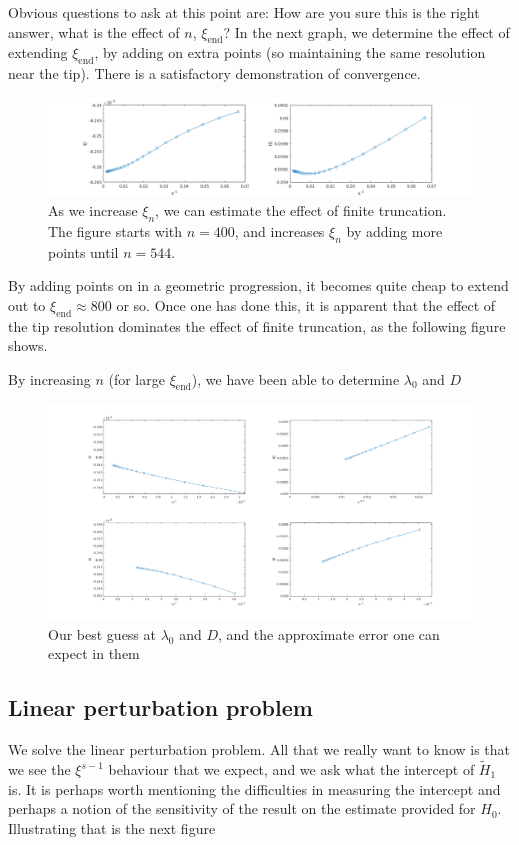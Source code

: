 \documentclass{jfm}
\begin{document}
Obvious questions to ask at this point are: How are you sure this is the right
answer, what is the effect of $n$,  $\xi_{\mathrm{end}}$? 
In the next graph, we determine the effect of extending $\xi_{\mathrm{end}}$,
by adding on extra points (so maintaining the same resolution near the tip).
There is a satisfactory demonstration of convergence.
\begin{figure}
  \centerline{\includegraphics[scale=0.5]{./../../Graphs/xend-march.png}}
  \caption{As we increase $\xi_{n}$, we can estimate the effect of finite 
           truncation. The figure starts with $n=400$, and increases $\xi_n$
           by adding more points until $n=544$.}
\end{figure}

By adding points on in a geometric progression, it becomes quite cheap to
extend out to $\xi_{\mbox{end}} \approx 800$ or so. Once one has done this,
it is apparent that the effect of the tip resolution dominates the effect
of finite truncation, as the following figure shows.

By increasing $n$ (for large $\xi_{\mathrm{end}}$), we have been able to 
determine $\lambda_0$ and $D$
\begin{figure}
  \centerline{\includegraphics[scale=0.3]{./../../Graphs/l0-D.png}}
  \caption{Our best guess at $\lambda_0$ and $D$, and the approximate error
one can expect in them}
\end{figure}
\subsection{Linear perturbation problem}
We solve the linear perturbation problem. All that we really want to know
is that we see the $\xi^{s-1}$ behaviour that we expect, and we ask what the
intercept of $\tilde{H}_1$ is. It is perhaps worth mentioning the difficulties
in measuring the intercept and perhaps a notion of the sensitivity of the 
result on the estimate provided for $H_0$. Illustrating that is the next
figure 
\end{document}

